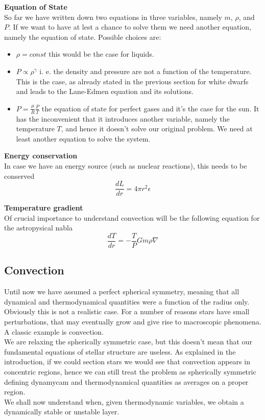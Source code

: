 \documentclass[11pt]{article}
\begin{document}
\textbf{Equation of State} \\
So far we have written down two equations in three variables, namely $m$, $\rho$, and $P$. If we want to have at lest a chance to solve them we need another equation, namely the equation of state. Possible choices are:
\begin{itemize}
	\item $\rho=const$ this would be the case for liquids.
	\item $P\propto \rho^\gamma$ i. e. the density and pressure are not a function of the temperature. This is the case, as already stated in the previous section for white dwarfs and leads to the Lane-Edmen equation and its solutions.
	\item $P=\frac{\mu}{R}\frac{P}{T}$ the equation of state for perfect gases and it's the case for the sun. It has the inconvenient that it introduces another variable, namely the temperature $T$, and hence it doesn't solve our original problem. We need at least another equation to solve the system. 
\end{itemize}

\textbf{Energy conservation} \\
In case we have an energy source (such as nuclear reactions), this needs to be conserved
\begin{equation}\label{energycons}
	\frac{dL}{dr} = 4 \pi r^2 \epsilon
\end{equation}

\textbf{Temperature gradient} \\
Of crucial importance to understand convection will be the following equation for the astropysical nabla
\begin{equation}\label{energytransfer}
\frac{d T}{d r} = - \frac{T }{P} G m \rho\nabla
\end{equation}


\subsection{Convection}
Until now we have assumed a perfect spherical symmetry, meaning that all dynamical and thermodynamical quantities were a function of the radius only. Obviously this is not a realistic case. For a number of reasons stars have small perturbations, that may eventually grow and give rise to macroscopic phenomena. A classic example is convection.\\
We are relaxing the spherically symmetric case, but this doesn't mean that our fundamental equations of stellar structure are useless. As explained in the introduction, if we could section stars we would see that convection appears in concentric regions, hence  we can still treat the problem as spherically symmetric defining dynamycam and thermodynamical quantities as averages on a proper region. \\
We shall now understand when, given thermodynamic variables, we obtain a dynamically stable or unstable layer.
\end{document}
